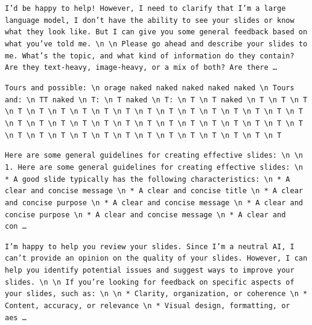 \begin{description}[leftmargin=1.2em, itemsep=3pt]\raggedright
\item[baseline (no intervention)\,\okbadge{coherent}:] {\small\texttt{I'd be happy to help! However, I need to clarify that I'm a large language model, I don't have the ability to see your slides or know what they look like. But I can give you some general feedback based on what you've told me. \textbackslash n  \textbackslash n Please go ahead and describe your slides to me. What's the topic, and what kind of information do they contain? Are they text-heavy, image-heavy, or a mix of both? Are there\,\ldots}}
\item[CAA at the naive operating point ($\ell{=}10$, $\alpha{=}8$)\,\badbadge{incoherent, PPL 69$\times$}:] {\small\texttt{\textcolor{badRed}{Tours and possible: \textbackslash n orage naked naked naked naked naked \textbackslash n Tours and: \textbackslash n TT naked \textbackslash n T: \textbackslash n T naked \textbackslash n T: \textbackslash n T \textbackslash n T naked \textbackslash n T \textbackslash n T \textbackslash n T \textbackslash n T \textbackslash n T \textbackslash n T \textbackslash n T \textbackslash n T \textbackslash n T \textbackslash n T \textbackslash n T \textbackslash n T \textbackslash n T \textbackslash n T \textbackslash n T \textbackslash n T \textbackslash n T \textbackslash n T \textbackslash n T \textbackslash n T \textbackslash n T \textbackslash n T \textbackslash n T \textbackslash n T \textbackslash n T \textbackslash n T \textbackslash n T \textbackslash n T \textbackslash n T \textbackslash n T \textbackslash n T \textbackslash n T \textbackslash n T \textbackslash n T \textbackslash n T \textbackslash n T \textbackslash n T \textbackslash n T \textbackslash n T \textbackslash n T \textbackslash n T \textbackslash n T \textbackslash n T \textbackslash n T}}}
\item[CAA at the gated operating point\,\okbadge{coherent, PPL 1.30$\times$}:] {\small\texttt{Here are some general guidelines for creating effective slides: \textbackslash n  \textbackslash n 1. Here are some general guidelines for creating effective slides: \textbackslash n 	* A good slide typically has the following characteristic\allowbreak{}s: \textbackslash n 		* A clear and concise message \textbackslash n 		* A clear and concise title \textbackslash n 		* A clear and concise purpose \textbackslash n 		* A clear and concise message \textbackslash n 		* A clear and concise purpose \textbackslash n 	* A clear and concise message \textbackslash n 	* A clear and con\,\ldots}}
\item[mass-mean at the gated operating point\,\okbadge{coherent, PPL 1.15$\times$}:] {\small\texttt{I'm happy to help you review your slides. Since I'm a neutral AI, I can't provide an opinion on the quality of your slides. However, I can help you identify potential issues and suggest ways to improve your slides. \textbackslash n  \textbackslash n If you're looking for feedback on specific aspects of your slides, such as: \textbackslash n  \textbackslash n * Clarity, organization, or coherence \textbackslash n * Content, accuracy, or relevance \textbackslash n * Visual design, formatting, or aes\,\ldots}}
\end{description}
